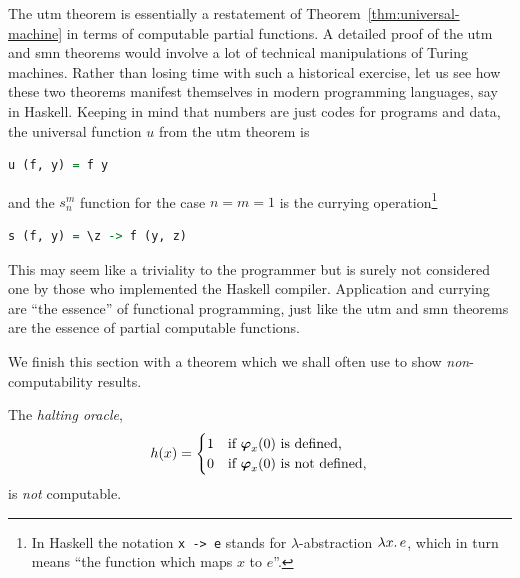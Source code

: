\noindent
The utm theorem is essentially a restatement of
Theorem~\ref{thm:universal-machine} in terms of computable partial
functions. A detailed proof of the utm and smn theorems would involve
a lot of technical manipulations of Turing machines. Rather than
losing time with such a historical exercise, let us see how these two
theorems manifest themselves in modern programming languages, say in
Haskell. Keeping in mind that numbers are just codes for programs and
data, the universal function $u$ from the utm theorem is
%
\begin{lstlisting}[language=Haskell]
u (f, y) = f y
\end{lstlisting}
%
and the $s_n^m$ function for the case $n = m = 1$ is the currying
operation\footnote{In Haskell the notation \texttt{{}x -> e}
  stands for $\lambda$-abstraction $\lambda x .\,e$, which in turn means
  ``the function which maps $x$ to $e$''.}
%
\begin{lstlisting}[language=Haskell]
s (f, y) = \z -> f (y, z)
\end{lstlisting}
%
This may seem like a triviality to the programmer but is surely not
considered one by those who implemented the Haskell compiler.
Application and currying are ``the essence'' of functional
programming, just like the utm and smn theorems are the essence of
partial computable functions.

We finish this section with a theorem which we shall often use to show
\emph{non}-computability results.

\begin{theorem}
  The \emph{halting oracle},
  \begin{equation*}
    h(x) =
    \begin{cases}
      1 & \text{if $\text{\boldmath{$\varphi$}}_{x}(0)$ is defined,}\\
      0 & \text{if $\text{\boldmath{$\varphi$}}_{x}(0)$ is not defined,}
    \end{cases}
  \end{equation*}
  is \emph{not} computable.
\end{theorem}

